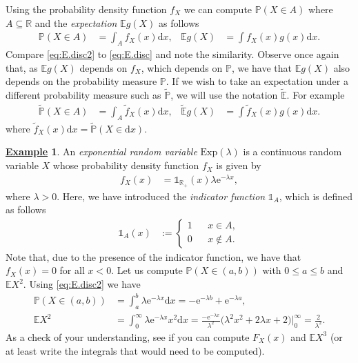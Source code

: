 \documentclass[12pt]{book}
\numberwithin{equation}{chapter}
\theoremstyle{plain}
\numberwithin{theorem}{section}
\theoremstyle{definition}
\newtheorem{example}[theorem]{\underline{Example}}
\numberwithin{exercise}{chapter}
\newcommand{\<}{\langle}
\renewcommand{\>}{\rangle}
\renewcommand{\(}{\left(}
\renewcommand{\)}{\right)}
\renewcommand{\[}{\left[}
\renewcommand{\]}{\right]}
\newcommand\Eb{\mathds{E}}
\newcommand\Pb{\mathds{P}}
\newcommand\Rb{\mathds{R}}
\newcommand\Ib{\mathds{1}}
\newcommand\lam{\lambda}
\newcommand\Ebt{\widetilde{\Eb}}
\newcommand\Pbt{\widetilde{\Pb}}
\newcommand\ft{\widetilde{f}}
\newcommand\dd{\mathrm{d}}
\newcommand\ee{\mathrm{e}}
\theoremstyle{definition}
\numberwithin{question}{section}
\begin{document}
\noindent
Using the probability density function $f_X$ we can compute $\Pb(X \in A)$ where $A \subseteq \Rb$ and the \textit{expectation} $\Eb g(X)$ as follows
\begin{align}
\Pb( X \in A)
	&=	\int_A f_X(x) \dd x, &
\Eb g(X)
	&=	\int f_X(x) g(x) \dd x . \label{eq:E.disc2}
\end{align}
Compare \eqref{eq:E.disc2} to \eqref{eq:E.disc} and note the similarity.  Observe once again that, as $\Eb g(X)$ depends on $f_X$, which depends on $\Pb$, we have that $\Eb g(X)$ also depends on the probability measure $\Pb$.  
If we wish to take an expectation under a different probability measure such as $\Pbt$, we will use the notation $\Ebt$.  For example
\begin{align}
\Pbt( X \in A)
	&=	\int_A \ft_X(x) \dd x, &
\Ebt g(X)
	&=	\int \ft_X(x) g(x) \dd x .
\end{align}
where $\ft_X(x) \dd x = \Pbt(X \in \dd x)$.

\begin{example}
An \textit{exponential random variable} $\text{Exp}(\lam)$ is a continuous random variable $X$ whose probability density function $f_X$ is given by
\begin{align}
f_X(x)
	&=	\Ib_{\Rb_+}(x) \lam \ee^{- \lam x} , 
\end{align}
where $\lam > 0$.  Here, we have introduced the \textit{indicator function} $\Ib_A$, which is defined as follows
\begin{align}
\Ib_A(x)
	&:=	\left\{ \begin{aligned}
			1 && x \in A , \\
			0 && x \notin A .
			\end{aligned} \right.
\end{align}
Note that, due to the presence of the indicator function, we have that $f_X(x) = 0$ for all $x < 0$.
Let us compute $\Pb(X \in (a,b))$ with $0 \leq a \leq b$ and $\Eb X^2$.  Using \eqref{eq:E.disc2} we have
\begin{align}
\Pb(X \in (a,b))
	&=	\int_a^b \lam \ee^{- \lam x} \dd x
	=		- \ee^{- \lam b} + \ee^{- \lam a}, \\
\Eb X^2
	&=	\int_0^\infty \lam \ee^{- \lam x} x^2 \dd x 
	=		\frac{-\ee^{-\lam x}}{\lam^2 } \Big( \lam^2 x^2+2 \lam  x+2 \Big) \Big|_{0}^{\infty}
	=		\frac{2}{\lam^2 } .
\end{align}
As a check of your understanding, see if you can compute $F_X(x)$ and $\Eb X^3$ (or at least write the integrals that would need to be computed).
\end{example}
\end{document}
